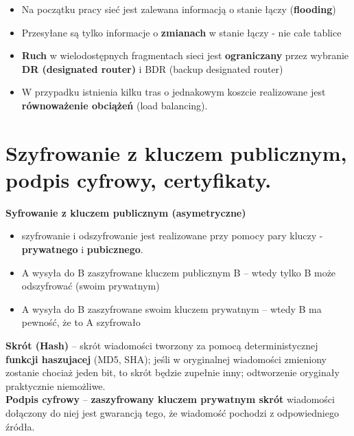 \documentclass[main.tex]{subfiles}
\begin{document}
\begin{itemize}[noitemsep]
        \item Na początku pracy sieć jest zalewana informacją o stanie łączy (\textbf{flooding})

        \item Przesyłane są tylko informacje o \textbf{zmianach} w stanie łączy - nie całe tablice

        \item \textbf{Ruch} w wielodostępnych fragmentach sieci jest \textbf{ograniczany} przez wybranie \textbf{DR (designated router)} i
        BDR (backup designated router)

        \item W przypadku istnienia kilku tras o jednakowym koszcie realizowane jest \textbf{równoważenie obciążeń}
        (load balancing).
    \end{itemize}


    \section{Szyfrowanie z kluczem publicznym, podpis cyfrowy, certyfikaty.}

    \textbf{Syfrowanie z kluczem publicznym (asymetryczne)}
    \begin{itemize}[noitemsep]
        \item szyfrowanie i odszyfrowanie jest realizowane przy pomocy pary kluczy - \textbf{prywatnego} i \textbf{pubicznego}.
        \item A wysyła do B zaszyfrowane kluczem publicznym B -- wtedy tylko B może odszyfrować (swoim prywatnym)
        \item A wysyła do B zaszyfrowane swoim kluczem prywatnym -- wtedy B ma pewność, że to A szyfrowało
    \end{itemize}

    \noindent \textbf{Skrót (Hash)} -- skrót wiadomości tworzony za pomocą deterministycznej \textbf{funkcji haszujacej}
    (MD5, SHA); jeśli w oryginalnej wiadomości zmieniony zostanie chociaż jeden bit, to skrót będzie zupełnie inny;
    odtworzenie oryginały praktycznie niemożliwe.\\

    \noindent \textbf{Podpis cyfrowy} -- \textbf{zaszyfrowany kluczem prywatnym skrót} wiadomości dołączony do niej jest
    gwarancją tego, że wiadomość pochodzi z odpowiedniego źródła.\\
\end{document}
